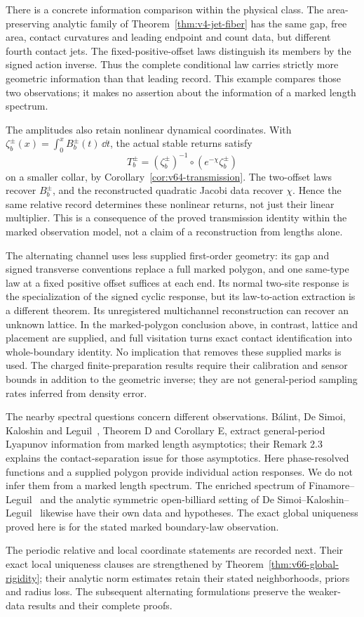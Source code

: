 There is a concrete information comparison within the physical class.
The area-preserving analytic family of
Theorem~\ref{thm:v4-jet-fiber} has the same gap, free area, contact
curvatures and leading endpoint and count data, but different fourth
contact jets.  The fixed-positive-offset laws distinguish its members
by the signed action inverse.  Thus the complete conditional law carries
strictly more geometric information than that leading record.  This
example compares those two observations; it makes no assertion about
the information of a marked length spectrum.

The amplitudes also retain nonlinear dynamical coordinates.  With
$\zeta_b^\pm(x)=\int_0^x B_b^\pm(t)\,\dd t$, the actual stable
returns satisfy
\[
 T_b^\pm=(\zeta_b^\pm)^{-1}\circ
                (e^{-\chi}\zeta_b^\pm)
\]
on a smaller collar, by Corollary~\ref{cor:v64-transmission}.
The two-offset laws recover $B_b^\pm$, and the reconstructed quadratic
Jacobi data recover $\chi$.  Hence the same relative record determines
these nonlinear returns, not just their linear multiplier.  This is
a consequence of the proved transmission identity within the marked
observation model, not a claim of a reconstruction from lengths alone.

The alternating channel uses less supplied first-order geometry: its gap
and signed transverse conventions replace a full marked polygon, and one
same-type law at a fixed positive offset suffices at each end.  Its
normal two-site response is the specialization of the signed cyclic
response, but its law-to-action extraction is a different theorem.  Its
unregistered multichannel reconstruction can recover an unknown lattice.
In the marked-polygon conclusion above, in contrast, lattice and placement
are supplied, and full visitation turns exact contact identification into
whole-boundary identity.  No implication that removes these supplied
marks is used.  The charged finite-preparation results require their
calibration and sensor bounds in addition to the geometric inverse;
they are not general-period sampling rates inferred from density error.

The nearby spectral questions concern different observations.
B\'alint, De Simoi, Kaloshin and Leguil~\cite{BDKL}, Theorem D and
Corollary E, extract general-period Lyapunov information from marked
length asymptotics; their Remark 2.3 explains the contact-separation
issue for those asymptotics.  Here phase-resolved functions and a supplied
polygon provide individual action responses.  We do not infer them from
a marked length spectrum.  The enriched spectrum of
Finamore--Leguil~\cite{FinamoreLeguil} and the analytic symmetric
open-billiard setting of De Simoi--Kaloshin--Leguil~\cite{DSKL} likewise
have their own data and hypotheses.  The exact global uniqueness proved
here is for the stated marked boundary-law observation.

The periodic relative and local coordinate statements are recorded next.
Their exact local uniqueness clauses are strengthened by
Theorem~\ref{thm:v66-global-rigidity}; their analytic norm estimates retain
their stated neighborhoods, priors and radius loss.  The subsequent
alternating formulations preserve the weaker-data results and their
complete proofs.
